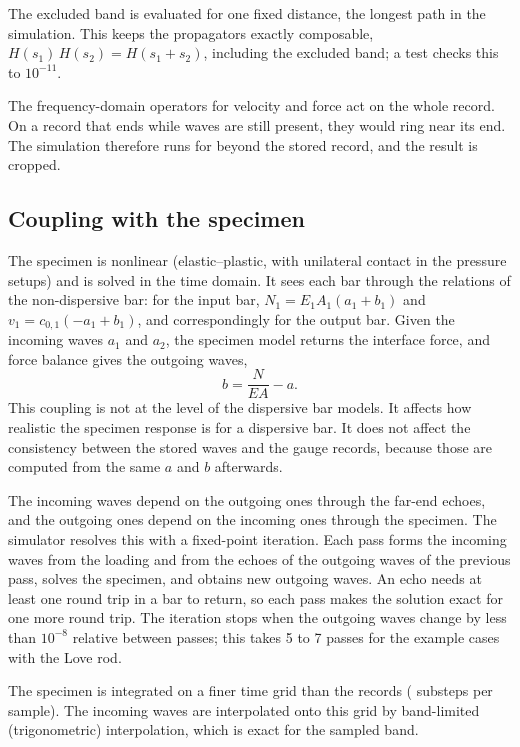 \documentclass[11pt,a4paper,numbers=noenddot,abstract=true]{scrartcl}
\newcommand{\code}[1]{\texttt{\detokenize{#1}}}
\begin{document}
The excluded band is evaluated for one fixed distance, the longest path in the simulation. This keeps the
propagators exactly composable, $H(s_1)\, H(s_2) = H(s_1 + s_2)$, including the excluded band; a test checks this
to $10^{-11}$.

The frequency-domain operators for velocity and force act on the whole record. On a record that ends while waves
are still present, they would ring near its end. The simulation therefore runs for \code{truth_margin} beyond the
stored record, and the result is cropped.

\subsection{Coupling with the specimen}

The specimen is nonlinear (elastic--plastic, with unilateral contact in the pressure setups) and is solved in the
time domain. It sees each bar through the relations of the non-dispersive bar: for the input bar,
$N_1 = E_1 A_1 (a_1 + b_1)$ and $v_1 = c_{0,1} (-a_1 + b_1)$, and correspondingly for the output bar. Given the
incoming waves $a_1$ and $a_2$, the specimen model returns the interface force, and force balance gives the
outgoing waves,
\begin{equation}
  b = \frac{N}{E A} - a.
\end{equation}
This coupling is not at the level of the dispersive bar models. It affects how realistic the specimen response is
for a dispersive bar. It does not affect the consistency between the stored waves and the gauge records, because
those are computed from the same $a$ and $b$ afterwards.

The incoming waves depend on the outgoing ones through the far-end echoes, and the outgoing ones depend on the
incoming ones through the specimen. The simulator resolves this with a fixed-point iteration. Each pass forms the
incoming waves from the loading and from the echoes of the outgoing waves of the previous pass, solves the
specimen, and obtains new outgoing waves. An echo needs at least one round trip in a bar to return, so each pass
makes the solution exact for one more round trip. The iteration stops when the outgoing waves change by less than
$10^{-8}$ relative between passes; this takes 5 to 7 passes for the example cases with the Love rod.

The specimen is integrated on a finer time grid than the records (\code{n_sub} substeps per sample). The incoming
waves are interpolated onto this grid by band-limited (trigonometric) interpolation, which is exact for the
sampled band.
\end{document}
